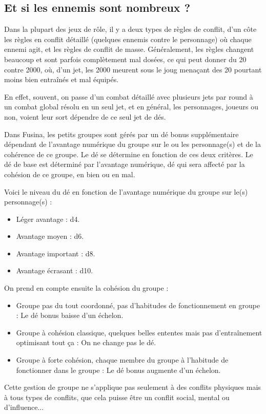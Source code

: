 \begin{multicols}{2}

\section{Et si les ennemis sont nombreux ?}

Dans la plupart des jeux de rôle, il y a deux types de règles de conflit, d'un côte les règles en conflit détaillé (quelques ennemis contre le personnage) où chaque ennemi agit, et les règles de conflit de masse. Généralement, les règles changent beaucoup et sont parfois complètement mal dosées, ce qui peut donner du 20 contre 2000, où, d'un jet, les 2000 meurent sous le joug menaçant des 20 pourtant moins bien entraînés et mal équipés.

En effet, souvent, on passe d'un combat détaillé avec plusieurs jets par round à un combat global résolu en un seul jet, et en général, les personnages, joueurs ou non, voient leur sort dépendre de ce seul jet de dés.

Dans Fusina, les petits groupes sont gérés par un dé bonus supplémentaire dépendant de l'avantage numérique du groupe sur le ou les personnage(s) et de la cohérence de ce groupe. Le dé se détermine en fonction de ces deux critères. Le dé de base est déterminé par l'avantage numérique, dé qui sera affecté par la cohésion de ce groupe, en bien ou en mal.

Voici le niveau du dé en fonction de l'avantage numérique du groupe sur le(s) personnage(s) :

\begin{itemize}
\item Léger avantage : d4.
\item Avantage moyen : d6.
\item Avantage important : d8.
\item Avantage écrasant : d10.
\end{itemize}

On prend en compte ensuite la cohésion du groupe :

\begin{itemize}
\item Groupe pas du tout coordonné, pas d'habitudes de fonctionnement en groupe : Le dé bonus baisse d'un échelon.
\item Groupe à cohésion classique, quelques belles ententes mais pas d'entraînement optimisant tout ça : On ne change pas le dé.
\item Groupe à forte cohésion, chaque membre du groupe à l'habitude de fonctionner dans le groupe : Le dé bonus augmente d'un échelon.
\end{itemize}

Cette gestion de groupe ne s'applique pas seulement à des conflits physiques mais à tous types de conflits, que cela puisse être un conflit social, mental ou d'influence...

\end{multicols}

